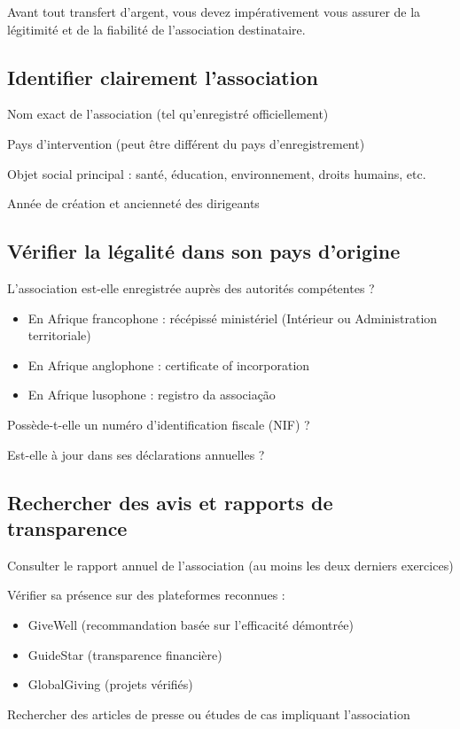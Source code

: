 \documentclass[12pt, a4paper]{article}
\begin{document}
Avant tout transfert d'argent, vous devez impérativement vous assurer de la légitimité et de la fiabilité de l'association destinataire.

\subsection{Identifier clairement l'association}
\begin{checklist}
    \item Nom exact de l'association (tel qu'enregistré officiellement)
    \item Pays d'intervention (peut être différent du pays d'enregistrement)
    \item Objet social principal : santé, éducation, environnement, droits humains, etc.
    \item Année de création et ancienneté des dirigeants
\end{checklist}

\subsection{Vérifier la légalité dans son pays d'origine}
\begin{checklist}
    \item L'association est-elle enregistrée auprès des autorités compétentes ?
    \begin{itemize}
        \item En Afrique francophone : récépissé ministériel (Intérieur ou Administration territoriale)
        \item En Afrique anglophone : certificate of incorporation
        \item En Afrique lusophone : registro da associação
    \end{itemize}
    \item Possède-t-elle un numéro d'identification fiscale (NIF) ?
    \item Est-elle à jour dans ses déclarations annuelles ?
\end{checklist}

\subsection{Rechercher des avis et rapports de transparence}
\begin{checklist}
    \item Consulter le rapport annuel de l'association (au moins les deux derniers exercices)
    \item Vérifier sa présence sur des plateformes reconnues :
    \begin{itemize}
        \item GiveWell (recommandation basée sur l'efficacité démontrée)
        \item GuideStar (transparence financière)
        \item GlobalGiving (projets vérifiés)
    \end{itemize}
    \item Rechercher des articles de presse ou études de cas impliquant l'association
\end{checklist}
\end{document}
